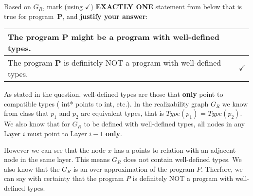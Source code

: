 \documentclass[12pt]{article}
\begin{document}
\begin{enumerate}
\begin{center}
\begin{tikzpicture}[auto,
        node distance=1.4cm, 
        ]
        \end{tikzpicture}
      \end{center}
      \vspace{-1ex}
        Based on $G_R$, mark (using $\checkmark$) \textbf{EXACTLY ONE} statement
        from below that is true for program~\textbf{P}, and \textbf{justify your
        answer}:
        \vspace{-2ex}
        \renewcommand{\arraystretch}{1.5}
        \begin{center}
        \begin{tabular}{|l|l|}
          \hline
          The program \textbf{P} might be a program with well-defined types. & \hspace{3em} \\ \hline
          The program \textbf{P} is definitely NOT a program with well-defined types. & $\checkmark$
          \\ \hline
        \end{tabular}
      \end{center}
      \vspace{-2ex}
       \begin{mdframed}
       
        As stated in the question, well-defined types are those that \textbf{only} point to compatible types ( int* points to int, etc.). In the realizability graph $G_R$ we know from class that $p_1$ and $p_2$ are equivalent types, that is $Type(p_1)$ = $Type(p_2)$. We also know that for $G_R$ to be defined with well-defined types, all nodes in any Layer $i$ must point to Layer $i-1$ \textbf{only}.

        However we can see that the node $x$ has a points-to relation with an adjacent node in the same layer. This means $G_R$ does not contain well-defined types. We also know that the $G_R$ is an over approximation of the program $P$. Therfore, we can say with certainty that the program $P$ is definitely NOT a program with well-defined types.
        
       \end{mdframed}
    

    \end{enumerate}
    
\end{document}
